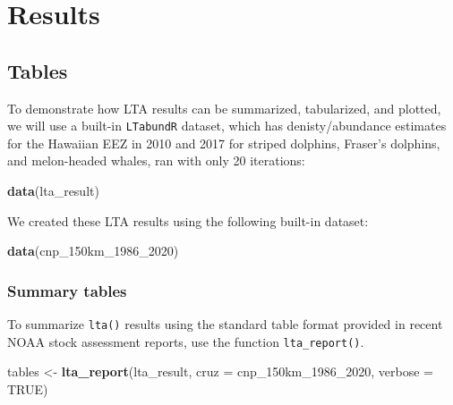 \documentclass[
]{book}
\newenvironment{Shaded}{\begin{snugshade}}{\end{snugshade}}
\newcommand{\DataTypeTok}[1]{\textcolor[rgb]{0.13,0.29,0.53}{#1}}
\newcommand{\DecValTok}[1]{\textcolor[rgb]{0.00,0.00,0.81}{#1}}
\newcommand{\KeywordTok}[1]{\textcolor[rgb]{0.13,0.29,0.53}{\textbf{#1}}}
\newcommand{\NormalTok}[1]{#1}
\newcommand{\OtherTok}[1]{\textcolor[rgb]{0.56,0.35,0.01}{#1}}
\newcommand{\StringTok}[1]{\textcolor[rgb]{0.31,0.60,0.02}{#1}}
\begin{document}
\hypertarget{part-results}{%
\part{Results}\label{part-results}}

\hypertarget{tables}{%
\chapter{Tables}\label{tables}}

To demonstrate how LTA results can be summarized, tabularized, and plotted, we will use a built-in \texttt{LTabundR} dataset, which has denisty/abundance estimates for the Hawaiian EEZ in 2010 and 2017 for striped dolphins, Fraser's dolphins, and melon-headed whales, ran with only 20 iterations:

\begin{Shaded}
\begin{Highlighting}[]
\KeywordTok{data}\NormalTok{(lta_result)}
\end{Highlighting}
\end{Shaded}

We created these LTA results using the following built-in dataset:

\begin{Shaded}
\begin{Highlighting}[]
\KeywordTok{data}\NormalTok{(cnp_150km_}\DecValTok{1986}\NormalTok{_}\DecValTok{2020}\NormalTok{)}
\end{Highlighting}
\end{Shaded}

\hypertarget{summary-tables}{%
\section*{Summary tables}\label{summary-tables}}

To summarize \texttt{lta()} results using the standard table format provided in recent NOAA stock assessment reports, use the function \texttt{lta\_report()}.

\begin{Shaded}
\begin{Highlighting}[]
\NormalTok{tables <-}\StringTok{ }\KeywordTok{lta_report}\NormalTok{(lta_result, }
                     \DataTypeTok{cruz =}\NormalTok{ cnp_150km_}\DecValTok{1986}\NormalTok{_}\DecValTok{2020}\NormalTok{,}
                     \DataTypeTok{verbose =} \OtherTok{TRUE}\NormalTok{)}
\end{Highlighting}
\end{Shaded}
\end{document}
